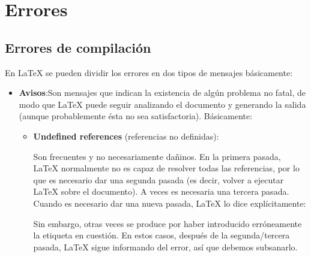 \chapter{Errores}\label{error}


\section{Errores de compilación}\label{errores}
En \LaTeX{} se pueden dividir los errores en dos tipos de mensajes básicamente:
\begin{itemize}
 \item \textbf{Avisos}:Son mensajes que indican la existencia de algún problema no fatal, de modo que LaTeX puede seguir analizando el documento y generando la salida (aunque probablemente ésta no sea satisfactoria). Básicamente:

	\begin{itemize}
         \item \textbf{Undefined references} (referencias no definidas): 
	\begin{figure}[h]
 	\begin{fblock}
  	\color{red}{
  	\begin{verbatim}
		LaTeX Warning: Reference `tab:tmn-std-informacion' 
		on page 234 undefined on input line 4873.\end{verbatim}
	}
	 \end{fblock}
	\end{figure}

	Son frecuentes y no necesariamente dañinos. En la primera pasada, LaTeX normalmente no es capaz de resolver todas las referencias, por lo que es necesario dar una segunda pasada (es decir, volver a ejecutar LaTeX sobre el documento). A veces es necesaria una tercera pasada. Cuando es necesario dar una nueva pasada, LaTeX lo dice explícitamente:
	\begin{figure}[h]
 	\begin{fblock}
  	\color{red}{
  	\begin{verbatim}LaTeX Warning: There were undefined references.
		LaTeX Warning: Label(s) may have changed. 
		Rerun to get cross-references right.\end{verbatim}
	}
	 \end{fblock}
	\end{figure}
	Sin embargo, otras veces se produce por haber introducido erróneamente la etiqueta en cuestión. En estos casos, después de la segunda/tercera pasada, LaTeX sigue informando del error, así que debemos subsanarlo. 
	\end{itemize}


\end{itemize}

